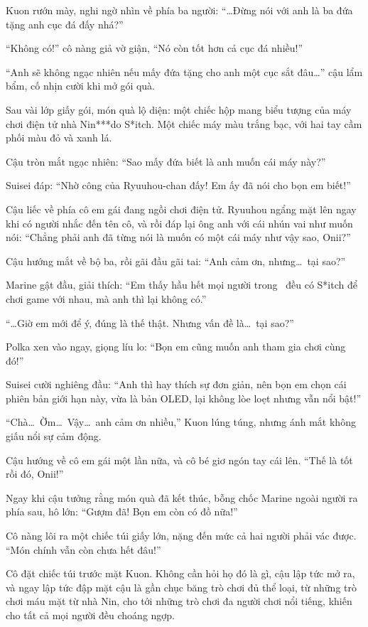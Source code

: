 \documentclass[../main.tex]{subfiles}
\begin{document}
Kuon rướn mày, nghi ngờ nhìn về phía ba người: ``\dots Đừng nói với anh là ba đứa tặng anh cục đá đấy nhá?''

``Không có!'' cô nàng giả vờ giận, ``Nó còn tốt hơn cả cục đá nhiều!''

``Anh sẽ không ngạc nhiên nếu mấy đứa tặng cho anh một cục sắt đâu\dots'' cậu lẩm bẩm, cố nhịn cười khi mở gói quà.

Sau vài lớp giấy gói, món quà lộ diện: một chiếc hộp mang biểu tượng của máy chơi điện tử nhà Nin***do S*itch. Một chiếc máy màu trắng bạc, với hai tay cầm phối màu đỏ và xanh lá.

Cậu tròn mắt ngạc nhiên: ``Sao mấy đứa biết là anh muốn cái máy này?''

Suisei đáp: ``Nhờ công của Ryuuhou-chan đấy! Em ấy đã nói cho bọn em biết!''

Cậu liếc về phía cô em gái đang ngồi chơi điện tử. Ryuuhou ngẩng mặt lên ngay khi có người nhắc đến tên cô, và rồi đáp lại ông anh với cái nhún vai như muốn nói: ``Chẳng phải anh đã từng nói là muốn có một cái máy như vậy sao, Onii?''

Cậu hướng mắt về bộ ba, rồi gãi đầu gãi tai: ``Anh cảm ơn, nhưng\dots\ tại sao?''

Marine gật đầu, giải thích: ``Em thấy hầu hết mọi người trong \hll\ đều có S*itch để chơi game với nhau, mà anh thì lại không có.''

``\dots Giờ em mới để ý, đúng là thế thật. Nhưng vấn đề là\dots\ tại sao?''

Polka xen vào ngay, giọng líu lo: ``Bọn em cũng muốn anh tham gia chơi cùng đó!''

Suisei cười nghiêng đầu: ``Anh thì hay thích sự đơn giản, nên bọn em chọn cái phiên bản giới hạn này, vừa là bản OLED, lại không lòe loẹt nhưng vẫn nổi bật!''

``Chà\dots\ Ờm\dots\ Vậy\dots\ anh cảm ơn nhiều,'' Kuon lúng túng, nhưng ánh mắt không giấu nổi sự cảm động.

Cậu hướng về cô em gái một lần nữa, và cô bé giơ ngón tay cái lên. ``Thế là tốt rồi đó, Onii!''

Ngay khi cậu tưởng rằng món quà đã kết thúc, bỗng chốc Marine ngoài người ra phía sau, hô lớn: ``Gượm đã! Bọn em còn có đồ nữa!''

Cô nàng lôi ra một chiếc túi giấy lớn, nặng đến mức cả hai người phải vác được. ``Món chính vẫn còn chưa hết đâu!''

Cô đặt chiếc túi trước mặt Kuon. Không cần hỏi họ đó là gì, cậu lập tức mở ra, và ngay lập tức đập mặt cậu là gần chục băng trò chơi đủ thể loại, từ những trò chơi máu mặt từ nhà Nin, cho tới những trò chơi đa người chơi nổi tiếng, khiến cho tất cả mọi người đều choáng ngợp.
\end{document}
